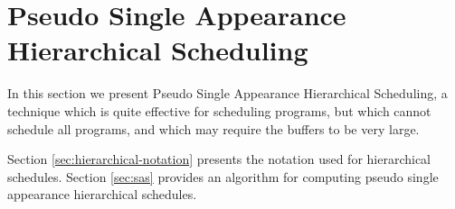 \section{Pseudo Single Appearance Hierarchical Scheduling}
\label{chpt:hierarchical}

In this section we present Pseudo Single Appearance Hierarchical
Scheduling, a technique which is quite effective for scheduling
{\StreamIt} programs, but which cannot schedule all programs, and
which may require the buffers to be very large.

\begin{comment}
Section \ref{sec:hierarchical:motivation} provides some motivation
for hierarchical scheduling.
\end{comment}
Section \ref{sec:hierarchical-notation} presents the notation used
for hierarchical schedules. Section \ref{sec:sas} provides an
algorithm for computing pseudo single appearance hierarchical
schedules.

